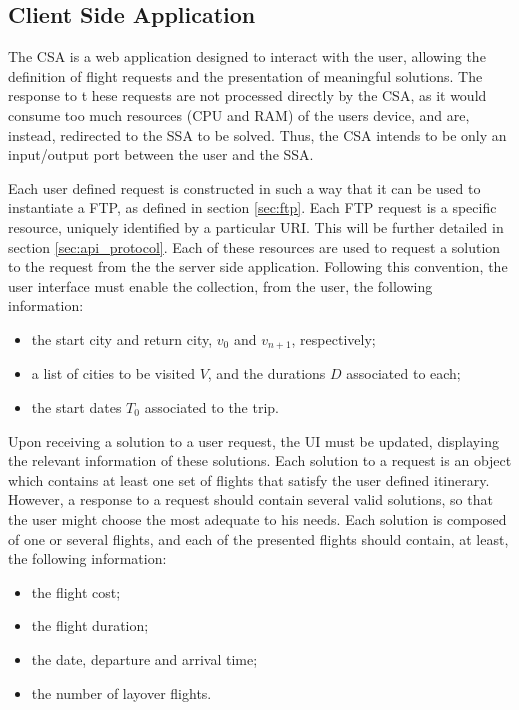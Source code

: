 \subsection{Client Side Application}
\label{sec:csa_design}

The CSA is a web application designed to interact with the user, allowing the definition of flight requests and the presentation of meaningful solutions. The response to t   hese requests are not processed directly by the CSA, as it would consume too much resources (CPU and RAM) of the users device, and are, instead, redirected to the SSA to be solved. Thus, the CSA intends to be only an input/output port between the user and the SSA. 

Each user defined request is constructed in such a way that it can be used to instantiate a FTP, as defined in section \ref{sec:ftp}. Each FTP request is a specific resource, uniquely identified by a particular \ac{URI}. This will be further detailed in section \ref{sec:api_protocol}. Each of these resources are used to request a solution to the request from the the server side application. Following this convention, the user interface must enable the collection, from the user, the following information:

\begin{itemize}
  \item the start city and return city, $v_{0}$ and $v_{n+1}$, respectively;
  \item a list of cities to be visited $V$, and the durations $D$ associated to each;
  \item the start dates $T_{0}$ associated to the trip.
\end{itemize}

Upon receiving a solution to a user request, the \ac{UI} must be updated, displaying the relevant information of these solutions. Each solution to a request is an object which contains at least one set of flights that satisfy the user defined itinerary. However, a response to a request should 
contain several valid solutions, so that the user might choose the most adequate to his needs.
Each solution is composed of one or several flights, and each of the presented flights should contain, at least, the following information:

\begin{itemize}
  \item the flight cost;
  \item the flight duration;
  \item the date, departure and arrival time;
  \item the number of layover flights.
\end{itemize}


